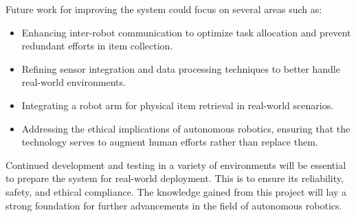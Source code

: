 \documentclass[conference]{IEEEtran}
\begin{document}
Future work for improving the system could focus on several areas such as:
\begin{itemize}
    \item Enhancing inter-robot communication to optimize task allocation and prevent redundant efforts in item collection.
    \item Refining sensor integration and data processing techniques to better handle real-world environments.
    \item Integrating a robot arm for physical item retrieval in real-world scenarios.
    \item Addressing the ethical implications of autonomous robotics, ensuring that the technology serves to augment human efforts rather than replace them.
\end{itemize}

Continued development and testing in a variety of environments will be essential to prepare the system for real-world deployment. This is to ensure its reliability, safety, and ethical compliance. The knowledge gained from this project will lay a strong foundation for further advancements in the field of autonomous robotics.




\end{document}
